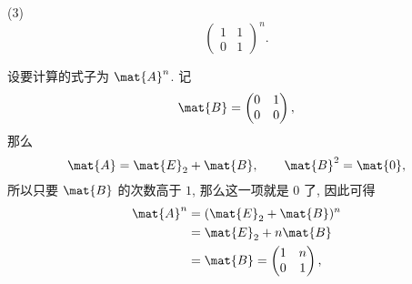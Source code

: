 \newpage
\begin{problem*}
(3)
\[
\begin{pmatrix}
    1 & 1 \\
    0 & 1
\end{pmatrix}^n.
\]
\end{problem*}
\begin{solution}
设要计算的式子为 $\mat{A}^n$. 记
\[
    \mat{B} = 
    \begin{pmatrix}
        0 & 1 \\
        0 & 0
    \end{pmatrix},
\]
那么
\[
\mat{A} = \mat{E}_2 + \mat{B}, \qquad \mat{B}^2 = \mat{0},
\]
所以只要 $\mat{B}$ 的次数高于 $1$, 那么这一项就是 $0$ 了, 因此可得
\[
\begin{aligned}
\mat{A}^n 
={}& (\mat{E}_2 + \mat{B})^n \\
={}& \mat{E}_2 + n\mat{B} \\
={}&
    \mat{B} = 
    \begin{pmatrix}
        1 & n \\
        0 & 1
    \end{pmatrix},
\end{aligned}
\]
\end{solution}

